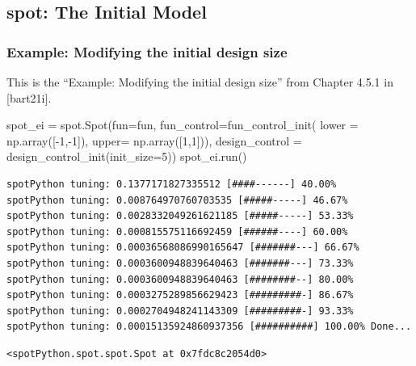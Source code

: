 \documentclass[
  letterpaper,
  DIV=11,
  numbers=noendperiod]{scrreprt}
\newenvironment{Shaded}{\begin{snugshade}}{\end{snugshade}}
\newcommand{\DecValTok}[1]{\textcolor[rgb]{0.68,0.00,0.00}{#1}}
\newcommand{\NormalTok}[1]{\textcolor[rgb]{0.00,0.23,0.31}{#1}}
\newcommand{\OperatorTok}[1]{\textcolor[rgb]{0.37,0.37,0.37}{#1}}
\begin{document}
\subsection{spot: The Initial Model}\label{spot-the-initial-model}

\subsubsection{Example: Modifying the initial design
size}\label{example-modifying-the-initial-design-size}

This is the ``Example: Modifying the initial design size'' from Chapter
4.5.1 in {[}bart21i{]}.

\begin{Shaded}
\begin{Highlighting}[]
\NormalTok{spot\_ei }\OperatorTok{=}\NormalTok{ spot.Spot(fun}\OperatorTok{=}\NormalTok{fun,}
\NormalTok{                fun\_control}\OperatorTok{=}\NormalTok{fun\_control\_init(}
\NormalTok{                lower }\OperatorTok{=}\NormalTok{ np.array([}\OperatorTok{{-}}\DecValTok{1}\NormalTok{,}\OperatorTok{{-}}\DecValTok{1}\NormalTok{]),}
\NormalTok{                upper}\OperatorTok{=}\NormalTok{ np.array([}\DecValTok{1}\NormalTok{,}\DecValTok{1}\NormalTok{])), }
\NormalTok{                design\_control }\OperatorTok{=}\NormalTok{ design\_control\_init(init\_size}\OperatorTok{=}\DecValTok{5}\NormalTok{))}
\NormalTok{spot\_ei.run()}
\end{Highlighting}
\end{Shaded}

\begin{verbatim}
spotPython tuning: 0.1377171827335512 [####------] 40.00% 
spotPython tuning: 0.008764970760703535 [#####-----] 46.67% 
spotPython tuning: 0.0028332049261621185 [#####-----] 53.33% 
spotPython tuning: 0.000815575116692459 [######----] 60.00% 
spotPython tuning: 0.00036568086990165647 [#######---] 66.67% 
spotPython tuning: 0.0003600948839640463 [#######---] 73.33% 
spotPython tuning: 0.0003600948839640463 [########--] 80.00% 
spotPython tuning: 0.0003275289856629423 [#########-] 86.67% 
spotPython tuning: 0.0002704948241143309 [#########-] 93.33% 
spotPython tuning: 0.00015135924860937356 [##########] 100.00% Done...
\end{verbatim}

\begin{verbatim}
<spotPython.spot.spot.Spot at 0x7fdc8c2054d0>
\end{verbatim}
\end{document}
